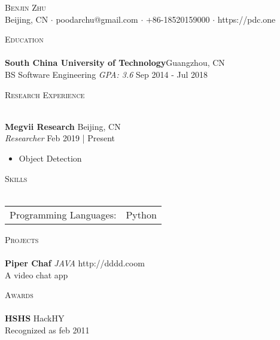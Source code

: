 \documentclass[a4paper]{article}
\newcommand{\lineunder} {
    \vspace*{-8pt} \\
    \hspace*{-18pt} \hrulefill \\
}
\newcommand{\header} [1] {
    {\hspace*{-18pt}\vspace*{6pt} \textsc{#1}}
    \vspace*{-6pt} \lineunder
}
\begin{document}
\vspace*{-40pt}

    

\vspace*{-10pt}
\begin{center}
	{\Huge \scshape {Benjin Zhu}}\\
	Beijing, CN $\cdot$ poodarchu@gmail.com $\cdot$ +86-18520159000 $\cdot$ https://pdc.one\\
\end{center}

\header{Education}
\textbf{South China University of Technology}\hfill Guangzhou, CN\\
BS Software Engineering \textit{GPA: 3.6} \hfill Sep 2014 - Jul 2018\\
\vspace{2mm}

\header{Research Experience}
\vspace{1mm}

\textbf{Megvii Research} \hfill Beijing, CN\\
\textit{Researcher} \hfill Feb 2019 | Present\\
\vspace{-1mm}
\begin{itemize} \itemsep 1pt
	\item Object Detection
\end{itemize}

\header{Skills}
\begin{tabular}{ l l }
	Programming Languages: & Python \\
\end{tabular}
\vspace{2mm}

\header{Projects}
{\textbf{Piper Chaf}} {\sl JAVA} \hfill http://dddd.coom\\
A video chat app\\
\vspace*{2mm}

\header{Awards}
\textbf{HSHS} \hfill HackHY\\
Recognized as \hfill feb 2011\\
\vspace*{2mm}

\ 
\end{document}
